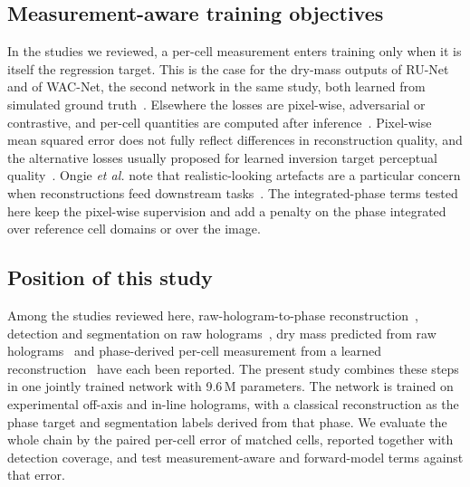 \documentclass[11pt]{article}
\begin{document}
\subsection{Measurement-aware training objectives}
\label{sec:rw-mawo}

In the studies we reviewed, a per-cell measurement enters training only when it
is itself the regression target. This is the case for the dry-mass outputs of
RU-Net and of WAC-Net, the second network in the same study, both learned from
simulated ground truth~\cite{bachimanchi2022microplankton}. Elsewhere the losses
are pixel-wise, adversarial or contrastive, and per-cell quantities are
computed after
inference~\cite{jaferzadeh2022holophasenet,li2025dlcspf,park2025holofluonet,park2026ai}.
Pixel-wise mean squared error does not fully reflect differences in
reconstruction quality, and the alternative losses usually proposed for learned
inversion target perceptual quality~\cite{lucas2018using}. Ongie \emph{et al.}
note that realistic-looking artefacts are a particular concern when
reconstructions feed downstream tasks~\cite{ongie2020deep}. The
integrated-phase terms tested here keep the pixel-wise supervision and add a
penalty on the phase integrated over reference cell domains or over the image.

\subsection{Position of this study}
\label{sec:rw-position}

Among the studies reviewed here, raw-hologram-to-phase
reconstruction~\cite{di2021phasenet,jaferzadeh2022holophasenet,zhao2023vynet,park2026simple},
detection and segmentation on raw
holograms~\cite{trujillo2019automatic,wen2026direct,delikoyun2025rthad}, dry
mass predicted from raw holograms~\cite{bachimanchi2022microplankton} and
phase-derived per-cell measurement from a learned
reconstruction~\cite{jaferzadeh2022holophasenet,park2026ai} have each been
reported. The present study combines these steps in one jointly trained
network with 9.6\,M parameters. The network is trained on experimental
off-axis and in-line holograms, with a classical reconstruction as the phase
target and segmentation labels derived from that phase. We evaluate the whole
chain by the paired per-cell error of matched cells, reported together with
detection coverage, and test measurement-aware and forward-model terms against
that error.

\end{document}
